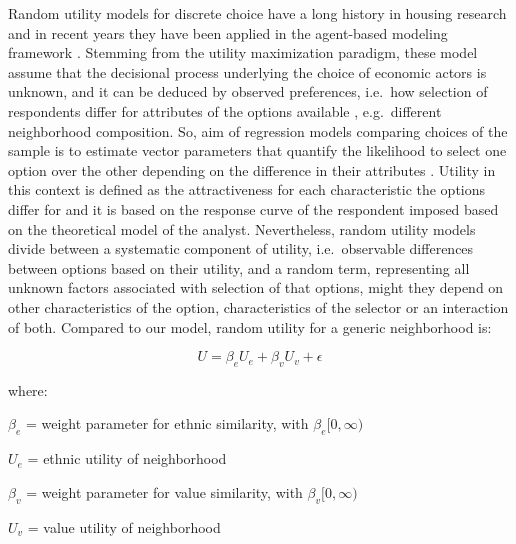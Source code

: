 \documentclass[
]{article}
\begin{document}
Random utility models for discrete choice have a long history in housing
research \citep{frankhauser2016deciding} and in recent years they have
been applied in the agent-based modeling framework
\citep{bruch2006neighborhood,bruch2012methodological}. Stemming from the
utility maximization paradigm, these model assume that the decisional
process underlying the choice of economic actors is unknown, and it can
be deduced by observed preferences, i.e.~how selection of respondents
differ for attributes of the options available
\citep{hess2018revisiting}, e.g.~different neighborhood composition. So,
aim of regression models comparing choices of the sample is to estimate
vector parameters that quantify the likelihood to select one option over
the other depending on the difference in their attributes
\citep{manski1977structure}. Utility in this context is defined as the
attractiveness for each characteristic the options differ for and it is
based on the response curve of the respondent
\citep{bruch2015agent,train2009discrete} imposed based on the
theoretical model of the analyst. Nevertheless, random utility models
divide between a systematic component of utility, i.e.~observable
differences between options based on their utility, and a random term,
representing all unknown factors associated with selection of that
options, might they depend on other characteristics of the option,
characteristics of the selector or an interaction of both. Compared to
our model, random utility for a generic neighborhood is:

\begin{equation}
    U = \beta_e U_e + \beta_v U_v + \epsilon
\end{equation}

where:

\par

\(\beta_e\) = weight parameter for ethnic similarity, with
\(\beta_e [0, \infty)\)

\par

\(U_e\) = ethnic utility of neighborhood

\par

\(\beta_v\) = weight parameter for value similarity, with
\(\beta_v [0, \infty)\)

\par

\(U_v\) = value utility of neighborhood

\par
\end{document}
